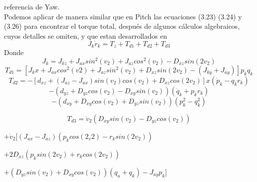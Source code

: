 referencia de Yaw.\\
Podemos aplicar de manera similar que en Pitch las ecuaciones (3.23) (3.24) y (3.26) para
encontrar el torque total, después de algunos cálculos algebraicos, cuyos detalles se omiten,
y que estan desarrollados en \cite{Paper::Yoon2001}
\begin{equation}
	J_k\dot{r}_k = T_z + T_{d1} + T_{d2} + T_{d3}
\end{equation}
Donde
\begin{equation}
	J_k = J_{kz} + J_{ax}sin^2(v_2) + J_{az}cos^2(v_2)- D_{xz}
	sin(2v_2)
\end{equation}
\begin{equation}
	T_{d1} = [J_kx + J_{ax}cos^2(v2) + J_{az}sin^2(v_2) +
			D_{xz}sin(2v_2)-(J_{ky} + J_{ay})]p_kq_k
\end{equation}
\begin{equation}
	T_{d2} = -[d_{xz} + (J_{az} - J_{ax})sin(v_2)cos(v_2)+
	D_{xz}cos(2v_2)] x (\dot{p}_k - q_kr_k)
\end{equation}
\begin{equation}\nonumber
	-(d_{yz} + D_{yz}cos(v_2) - D_{xy}sin(v_2))(\dot{q}_k + p_kr_k)
\end{equation}
\begin{equation}\nonumber
	-(d_{xy} + D_{xy}cos(v_2) + D_{yz}sin(v_2))(p^2_k - q^2_k)
\end{equation}

\begin{equation}
	T_{d3} = \ddot{v}_2(D_{xy}sin(v_2)-D_{yz}cos(v_2))
\end{equation}
\begin{center}
	$+ \dot{v}_2[(J_{ax}-J_{az})(p_kcos(2_v2)-r_ksin(2v_2))$
\end{center}
\begin{center}
	$+2D_{xz}(p_ksin(2v_2)+r_kcos(2v_2))$
\end{center}
\begin{center}
	$
	+(D_{yz}sin(v_2) + D_{xy}cos(v_2))(q_a+q_k) - J_{ay}p_k]
	$
\end{center}

